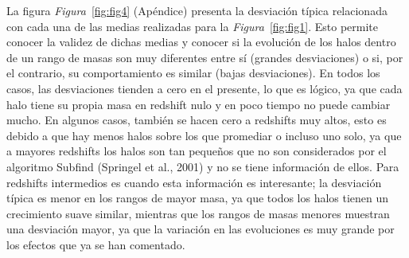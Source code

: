 La figura \textit{Figura}~\ref{fig:fig4} (Apéndice) presenta la desviación típica relacionada con cada una de las medias realizadas para la \textit{Figura}~\ref{fig:fig1}. Esto permite conocer la validez de dichas medias y conocer si la evolución de los halos dentro de un rango de masas son muy diferentes entre sí (grandes desviaciones) o si, por el contrario, su comportamiento es similar (bajas desviaciones). En todos los casos, las desviaciones tienden a cero en el presente, lo que es lógico, ya que cada halo tiene su propia masa en redshift nulo y en poco tiempo no puede cambiar mucho. En algunos casos, también se hacen cero a redshifts muy altos, esto es debido a que hay menos halos sobre los que promediar o incluso uno solo, ya que a mayores redshifts los halos son tan pequeños que no son considerados por el algoritmo Subfind (Springel et al., 2001) \cite{8} y no se tiene información de ellos. Para redshifts intermedios es cuando esta información es interesante; la desviación típica es menor en los rangos de mayor masa, ya que todos los halos tienen un crecimiento suave similar, mientras que los rangos de masas menores muestran una desviación mayor, ya que la variación en las evoluciones es muy grande por los efectos que ya se han comentado. \\

